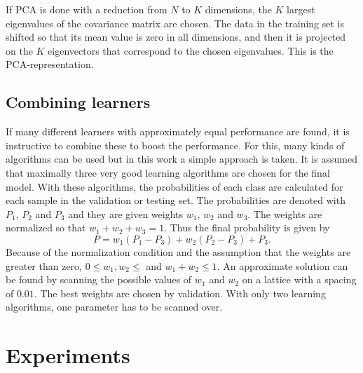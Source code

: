 \documentclass[twoside]{article}
\begin{document}
\begin{multicols}{2}
If PCA is done with a reduction from $N$ to
$K$ dimensions, the $K$ largest eigenvalues of the covariance matrix are chosen. The data in the training set is shifted so that
its mean value is zero in all dimensions, and then it is projected on the $K$ eigenvectors that correspond
to the chosen eigenvalues. This is the PCA-representation.

\subsection{Combining learners}\label{method:combo}

If many different learners with approximately equal performance are found, it is instructive
to combine these to boost the performance. For this, many kinds of algorithms can be used
but in this work a simple approach is taken. It is assumed that maximally three very good
learning algorithms are chosen for the final model. With these algorithms, the probabilities
of each class are calculated for each sample in the validation or testing set. The probabilities
are denoted with $P_1$, $P_2$ and $P_3$ and they are given weights $w_1$, $w_2$ and $w_3$.
The weights are normalized so that $w_1 + w_2 + w_3 = 1$. Thus the final probability is given by
\begin{equation}
 P = w_1 ( P_1 - P_3 ) + w_2 ( P_2 - P_3 ) + P_3.
\end{equation}
Because of the normalization condition and the assumption that the weights are greater than zero,  $0 \leq w_1,w_2 \leq$ and $w_1 + w_2 \leq 1$. 
An approximate solution can be found by scanning the possible values of $w_1$ and $w_2$ on a lattice with a spacing of $0.01$.
The best weights are chosen by validation. With only two learning algorithms, one parameter has to be scanned over.



\section{Experiments}


\end{multicols}
\end{document}
